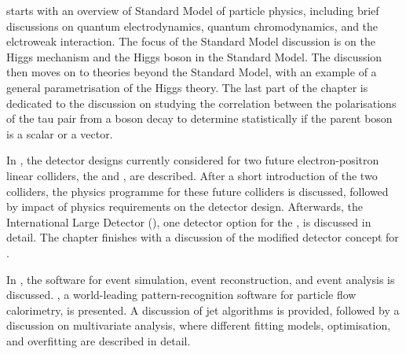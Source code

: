
 starts with an overview of Standard Model of particle physics, including brief discussions on quantum electrodynamics, quantum chromodynamics, and the elctroweak interaction. The focus of the Standard Model discussion is on the  Higgs mechanism and the Higgs boson in the Standard Model. The discussion then moves on to theories beyond the Standard Model, with an example of   a general parametrisation of the Higgs theory. The last part of the chapter is dedicated to the discussion on studying the correlation between the polarisations of the  tau pair from a boson decay to determine statistically if the parent boson is a  scalar or a vector.



In , the detector designs currently considered for two future electron-positron linear colliders, the \ILC and \CLIC, are described. After a short introduction of the two colliders, the physics programme for these future colliders is discussed, followed by impact of physics requirements on the detector design. Afterwards, the International Large Detector (\ILD), one detector option for the \ILC, is discussed in detail. The chapter finishes with a discussion of the modified \ILD detector concept for \CLIC.

In , the software for event simulation, event reconstruction, and event analysis is  discussed.  \pandora, a world-leading pattern-recognition software for particle flow calorimetry, is presented. A discussion of jet algorithms is provided, followed by a discussion on  multivariate analysis, where different fitting models, optimisation, and overfitting are described in detail.




